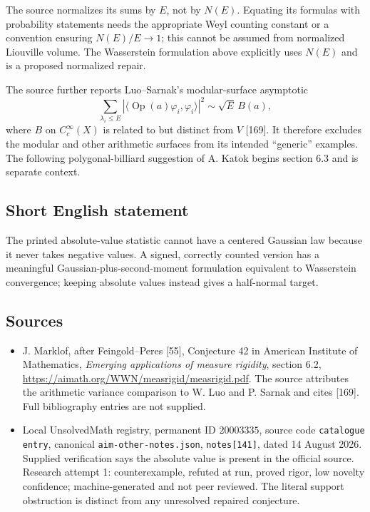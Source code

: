 \documentclass[11pt]{article}
\begin{document}
The source normalizes its sums by $E$, not by $N(E)$. Equating its formulas with probability statements needs the appropriate Weyl counting constant or a convention ensuring $N(E)/E\to1$; this cannot be assumed from normalized Liouville volume. The Wasserstein formulation above explicitly uses $N(E)$ and is a proposed normalized repair.

The source further reports Luo--Sarnak's modular-surface asymptotic
\[
 \sum_{\lambda_i\le E}|\langle\operatorname{Op}(a)\varphi_i,\varphi_i\rangle|^2
 \sim\sqrt E\,B(a),
\]
where $B$ on $C_c^\infty(X)$ is related to but distinct from $V$ [169]. It therefore excludes the modular and other arithmetic surfaces from its intended ``generic'' examples. The following polygonal-billiard suggestion of A. Katok begins section 6.3 and is separate context.
\subsection{Short English statement}
The printed absolute-value statistic cannot have a centered Gaussian law because it never takes negative values. A signed, correctly counted version has a meaningful Gaussian-plus-second-moment formulation equivalent to Wasserstein convergence; keeping absolute values instead gives a half-normal target.
\subsection{Sources}
\begin{itemize}
\item J. Marklof, after Feingold--Peres [55], Conjecture 42 in American Institute of Mathematics, \emph{Emerging applications of measure rigidity}, section 6.2, \url{https://aimath.org/WWN/measrigid/measrigid.pdf}. The source attributes the arithmetic variance comparison to W. Luo and P. Sarnak and cites [169]. Full bibliography entries are not supplied.
\item Local UnsolvedMath registry, permanent ID $20003335$, source code \texttt{catalogue entry}, canonical \texttt{aim-other-notes.json}, \texttt{notes[141]}, dated 14 August 2026. Supplied verification says the absolute value is present in the official source. Research attempt 1: counterexample, refuted at run, proved rigor, low novelty confidence; machine-generated and not peer reviewed. The literal support obstruction is distinct from any unresolved repaired conjecture.
\end{itemize}
\end{document}
